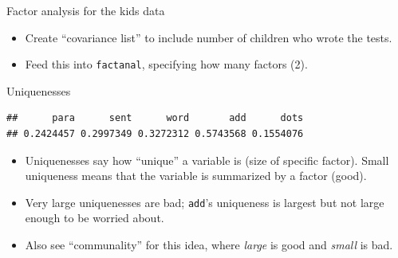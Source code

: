 \documentclass[
  ignorenonframetext,
]{beamer}
\newenvironment{Shaded}{\begin{snugshade}}{\end{snugshade}}
\newcommand{\DataTypeTok}[1]{\textcolor[rgb]{0.13,0.29,0.53}{#1}}
\newcommand{\DecValTok}[1]{\textcolor[rgb]{0.00,0.00,0.81}{#1}}
\newcommand{\KeywordTok}[1]{\textcolor[rgb]{0.13,0.29,0.53}{\textbf{#1}}}
\newcommand{\NormalTok}[1]{#1}
\newcommand{\OperatorTok}[1]{\textcolor[rgb]{0.81,0.36,0.00}{\textbf{#1}}}
\newcommand{\StringTok}[1]{\textcolor[rgb]{0.31,0.60,0.02}{#1}}
\begin{document}
\begin{frame}[fragile]{Factor analysis for the kids data}
\protect\hypertarget{factor-analysis-for-the-kids-data}{}

\begin{itemize}
\item
  Create ``covariance list'' to include number of children who wrote the
  tests.
\item
  Feed this into \texttt{factanal}, specifying how many factors (2).
\end{itemize}

\begin{Shaded}
\end{Shaded}

\end{frame}

\begin{frame}[fragile]{Uniquenesses}
\protect\hypertarget{uniquenesses}{}

\begin{Shaded}
\end{Shaded}

\begin{verbatim}
##      para      sent      word       add      dots 
## 0.2424457 0.2997349 0.3272312 0.5743568 0.1554076
\end{verbatim}

\begin{itemize}
\item
  Uniquenesses say how ``unique'' a variable is (size of specific
  factor). Small uniqueness means that the variable is summarized by a
  factor (good).
\item
  Very large uniquenesses are bad; \texttt{add}'s uniqueness is largest
  but not large enough to be worried about.
\item
  Also see ``communality'' for this idea, where \emph{large} is good and
  \emph{small} is bad.
\end{itemize}

\end{frame}
\end{document}
